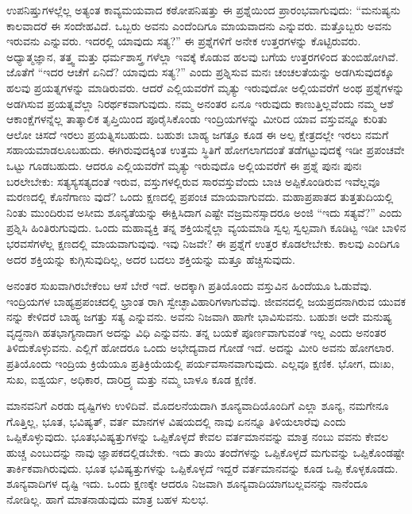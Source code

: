 ಉಪನಿಷ್ತುಗಳಲ್ಲೆಲ್ಲ ಅತ್ಯಂತ ಕಾವ್ಯಮಯವಾದ ಕಠೋಪನಿಷತ್ತು ಈ ಪ್ರಶ್ನೆಯಿಂದ ಪ್ರಾರಂಭವಾಗುವುದು: “ಮನುಷ್ಯನು ಕಾಲವಾದರೆ ಈ ಸಂದೇಹವಿದೆ. ಒಬ್ಬರು ಅವನು ಎಂದೆಂದಿಗೂ ಮಾಯವಾದನು ಎನ್ನುವರು. ಮತ್ತೊಬ್ಬರು ಅವನು ಇರುವನು ಎನ್ನುವರು. ಇದರಲ್ಲಿ ಯಾವುದು ಸತ್ಯ?” ಈ ಪ್ರಶ್ನೆಗಳಿಗೆ ಅನೇಕ ಉತ್ತರಗಳನ್ನು ಕೊಟ್ಟಿರುವರು. ಅಧ್ಯಾತ್ಮಜ್ಞಾನ, ತತ್ತ್ವ ಮತ್ತು ಧರ್ಮಶಾಸ್ತ್ರ ಗಳೆಲ್ಲಾ ಇವಕ್ಕೆ ಕೊಡುವ ಹಲವು ಬಗೆಯ ಉತ್ತರಗಳಿಂದ ತುಂಬಿಹೋಗಿವೆ. ಜೊತೆಗೆ “ಇದರ ಆಚೆಗೆ ಏನಿದೆ? ಯಾವುದು ಸತ್ಯ?” ಎಂದು ಪ್ರಶ್ನಿಸುವ ಮನಃ ಚಂಚಲತೆಯನ್ನು ಅಡಗಿಸುವುದಕ್ಕೂ ಹಲವು ಪ್ರಯತ್ನಗಳನ್ನು ಮಾಡಿರುವರು. ಆದರೆ ಎಲ್ಲಿಯವರೆಗೆ ಮೃತ್ಯು ಇರುವುದೋ ಅಲ್ಲಿಯವರೆಗೆ ಅಂಥ ಪ್ರಶ್ನೆಗಳನ್ನು ಅಡಗಿಸುವ ಪ್ರಯತ್ನವೆಲ್ಲಾ ನಿರರ್ಥಕವಾಗುವುದು. ನಮ್ಮ ಅನಂತರ ಏನೂ ಇರುವುದು ಕಾಣುತ್ತಿಲ್ಲವೆಂದು ನಮ್ಮ ಆಶೆ ಆಕಾಂಕ್ಷೆಗಳನ್ನೆಲ್ಲ ತಾತ್ಕಾಲಿಕ ತೃಪ್ತಿಯಿಂದ ಪೂರೈಸಿಕೊಂಡು ಇಂದ್ರಿಯಗಳನ್ನು ಮೀರಿದ ಯಾವ ವಸ್ತುವನ್ನೂ ಕುರಿತು ಆಲೋ ಚಿಸದೆ ಇರಲು ಪ್ರಯತ್ನಿಸಬಹುದು. ಬಹುಶಃ ಬಾಹ್ಯ ಜಗತ್ತೂ ಕೂಡ ಈ ಅಲ್ಪ ಕ್ಷೇತ್ರದಲ್ಲೇ ಇರಲು ನಮಗೆ ಸಹಾಯಮಾಡಲೂಬಹುದು. ಈಗಿರುವುದಕ್ಕಿಂತ ಉತ್ತಮ ಸ್ಥಿತಿಗೆ ಹೋಗಲಾಗದಂತೆ ತಡೆಗಟ್ಟುವುದಕ್ಕೆ ಇಡೀ ಪ್ರಪಂಚವೇ ಒಟ್ಟು ಗೂಡಬಹುದು. ಆದರೂ ಎಲ್ಲಿಯವರೆಗೆ ಮೃತ್ಯು ಇರುವುದೊ ಅಲ್ಲಿಯವರೆಗೆ ಈ ಪ್ರಶ್ನೆ ಪುನಃ ಪುನಃ ಬರಲೇಬೇಕು: ಸತ್ಯಸ್ಯಸತ್ಯದಂತೆ ಇರುವ, ವಸ್ತುಗಳಲ್ಲಿರುವ ಸಾರವಸ್ತುವೆಂದು ಬಾಚಿ ಅಪ್ಪಿಕೊಂಡಿರುವ ಇವೆಲ್ಲವೂ ಮರಣದಲ್ಲಿ ಕೊನೆಗಾಣು ವುದೆ? ಒಂದು ಕ್ಷಣದಲ್ಲಿ ಪ್ರಪಂಚ ಮಾಯವಾಗುವದು. ಮಹಾಪ್ರಪಾತದ ತುತ್ತತುದಿಯಲ್ಲಿ ನಿಂತು ಮುಂದಿರುವ ಅಸೀಮ ಶೂನ್ಯತೆಯನ್ನು ಈಕ್ಷಿಸಿದಾಗ ಎಷ್ಟೇ ವಜ್ರಮನಸ್ಸಾದರೂ ಅಂಜಿ “ಇದು ಸತ್ಯವೆ?” ಎಂದು ಪ್ರಶ್ನಿಸಿ ಹಿಂತಿರುಗುವುದು. ಒಂದು ಮಹಾವ್ಯಕ್ತಿ ತನ್ನ ಶಕ್ತಿಯನ್ನೆಲ್ಲಾ ವ್ಯಯಮಾಡಿ ಸ್ವಲ್ಪ ಸ್ವಲ್ಪವಾಗಿ ಕೂಡಿಟ್ಟ ಇಡೀ ಬಾಳಿನ ಭರವಸೆಗಳೆಲ್ಲ ಕ್ಷಣದಲ್ಲಿ ಮಾಯವಾಗುವುವು. ಇವು ನಿಜವೇ? ಈ ಪ್ರಶ್ನೆಗೆ ಉತ್ತರ ಕೊಡಲೇಬೇಕು. ಕಾಲವು ಎಂದಿಗೂ ಅದರ ಶಕ್ತಿಯನ್ನು ಕುಗ್ಗಿಸುವುದಿಲ್ಲ, ಅದರ ಬದಲು ಶಕ್ತಿಯನ್ನು ಮತ್ತೂ ಹೆಚ್ಚಿಸುವುದು.

ಅನಂತರ ಸುಖವಾಗಿರಬೇಕೆಂಬ ಆಸೆ ಬೇರೆ ಇದೆ. ಅದಕ್ಕಾಗಿ ಪ್ರತಿಯೊಂದು ವಸ್ತುವಿನ ಹಿಂದೆಯೂ ಓಡುವೆವು. ಇಂದ್ರಿಯಗಳ ಬಾಹ್ಯಪ್ರಪಂಚದಲ್ಲಿ ಭ್ರಾಂತ ರಾಗಿ ಸ್ವೇಚ್ಛಾವಿಹಾರಿಗಳಾಗುವೆವು. ಜೀವನದಲ್ಲಿ ಜಯಪ್ರದನಾಗಿರುವ ಯುವಕ ನನ್ನು ಕೇಳಿದರೆ ಬಾಹ್ಯ ಜಗತ್ತು ಸತ್ಯ ಎನ್ನುವನು. ಅವನು ನಿಜವಾಗಿ ಹಾಗೇ ಭಾವಿಸುವನು. ಬಹುಶಃ ಅದೇ ಮನುಷ್ಯ ವೃದ್ಧನಾಗಿ ಹತಭಾಗ್ಯನಾದಾಗ ಅದನ್ನು ವಿಧಿ ಎನ್ನುವನು. ತನ್ನ ಬಯಕೆ ಪೂರ್ಣವಾಗುವಂತೆ ಇಲ್ಲ ಎಂದು ಅನಂತರ ತಿಳಿದುಕೊಳ್ಳುವನು. ಎಲ್ಲಿಗೆ ಹೋದರೂ ಒಂದು ಅಭೇದ್ಯವಾದ ಗೋಡೆ ಇದೆ. ಅದನ್ನು ಮೀರಿ ಅವನು ಹೋಗಲಾರ. ಪ್ರತಿಯೊಂದು ಇಂದ್ರಿಯ ಕ್ರಿಯೆಯೂ ಪ್ರತಿಕ್ರಿಯೆಯಲ್ಲಿ ಪರ್ಯವಸಾನವಾಗುವುದು. ಎಲ್ಲವೂ ಕ್ಷಣಿಕ. ಭೋಗ, ದುಃಖ, ಸುಖ, ಐಶ್ವರ್ಯ, ಅಧಿಕಾರ, ದಾರಿದ್ರ್ಯ ಮತ್ತು ನಮ್ಮ ಬಾಳೂ ಕೂಡ ಕ್ಷಣಿಕ.

ಮಾನವನಿಗೆ ಎರಡು ದೃಷ್ಟಿಗಳು ಉಳಿದಿವೆ. ಮೊದಲನೆಯದಾಗಿ ಶೂನ್ಯವಾದಿಯೊಂದಿಗೆ ಎಲ್ಲಾ ಶೂನ್ಯ, ನಮಗೇನೂ ಗೊತ್ತಿಲ್ಲ, ಭೂತ, ಭವಿಷ್ಯತ್​, ವರ್ತ ಮಾನಗಳ ವಿಷಯದಲ್ಲಿ ನಾವು ಏನನ್ನೂ ತಿಳಿಯಲಾರೆವು ಎಂದು ಒಪ್ಪಿಕೊಳ್ಳುವುದು. ಭೂತಭವಿಷ್ಯತ್ತುಗಳನ್ನು ಒಪ್ಪಿಕೊಳ್ಳದೆ ಕೇವಲ ವರ್ತಮಾನವನ್ನು ಮಾತ್ರ ನಂಬು ವವನು ಕೇವಲ ಹುಚ್ಚ ಎಂಬುದನ್ನು ನಾವು ಜ್ಞಾಪಕದಲ್ಲಿಡಬೇಕು. ಇದು ತಾಯಿ ತಂದೆಗಳನ್ನು ಒಪ್ಪಿಕೊಳ್ಳದೆ ಮಗುವನ್ನು ಒಪ್ಪಿಕೊಂಡಷ್ಟೇ ತಾರ್ಕಿಕವಾಗಿರುವುದು. ಭೂತ ಭವಿಷ್ಯತ್ತುಗಳನ್ನು ಒಪ್ಪಿಕೊಳ್ಳದೆ ಇದ್ದರೆ ವರ್ತಮಾನವನ್ನು ಕೂಡ ಒಪ್ಪಿ ಕೊಳ್ಳಕೂಡದು. ಶೂನ್ಯವಾದಿಗಳ ದೃಷ್ಟಿ ಇದು. ಒಂದು ಕ್ಷಣಕ್ಕೇ ಆದರೂ ನಿಜವಾಗಿ ಶೂನ್ಯವಾದಿಯಾಗಬಲ್ಲವನನ್ನು ನಾನೆಂದೂ ನೋಡಿಲ್ಲ. ಹಾಗೆ ಮಾತನಾಡುವುದು ಮಾತ್ರ ಬಹಳ ಸುಲಭ.

